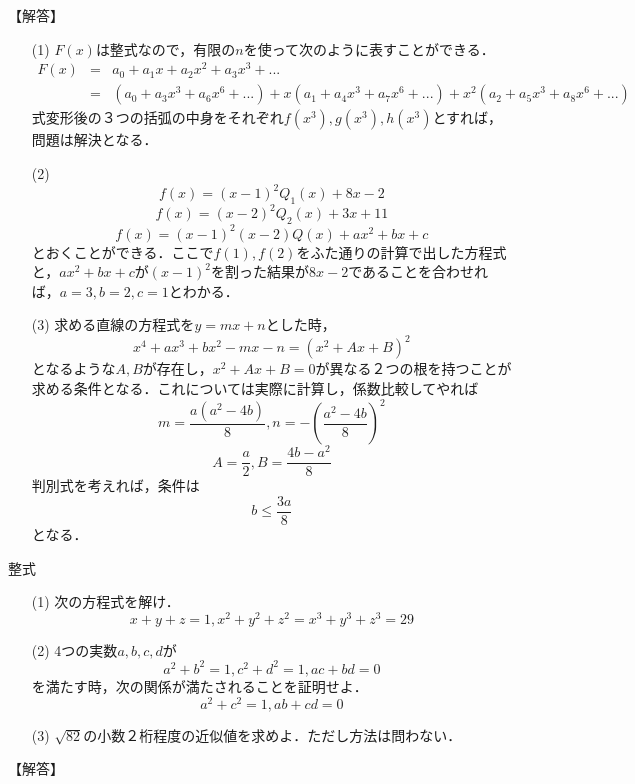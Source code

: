 \documentclass[a4paper,fleqn,dvipdfmx]{jsarticle}
\begin{document}
\begin{flushleft}
【解答】
\end{flushleft}

\begin{itemize}
    \item [(1)] $F(x)$は整式なので，有限の$n$を使って次のように表すことができる．
    \begin{eqnarray}
        F(x)&=&a_0+a_1x+a_2x^2+a_3x^3+...\\ &=&(a_0+a_3x^3+a_6x^6+...)+x(a_1+a_4x^3+a_7x^6+...)+x^2(a_2+a_5x^3+a_8x^6+...)
    \end{eqnarray}
    式変形後の３つの括弧の中身をそれぞれ$f(x^3),g(x^3),h(x^3)$とすれば，問題は解決となる．
    \item [(2)] $$f(x)=(x-1)^2Q_1(x)+8x-2$$
    $$f(x)=(x-2)^2Q_2(x)+3x+11$$
    $$f(x)=(x-1)^2(x-2)Q(x)+ax^2+bx+c$$
    とおくことができる．ここで$f(1),f(2)$をふた通りの計算で出した方程式と，$ax^2+bx+c$が$(x-1)^2$を割った結果が$8x-2$であることを合わせれば，$a=3,b=2,c=1$とわかる．
    \item [(3)] 求める直線の方程式を$y=mx+n$とした時，$$x^4+ax^3+bx^2-mx-n=(x^2+Ax+B)^2$$となるような$A,B$が存在し，$x^2+Ax+B=0$が異なる２つの根を持つことが求める条件となる．これについては実際に計算し，係数比較してやれば
    $$m=\frac{a(a^2-4b)}{8},n=-\left (\frac{a^2-4b}{8}\right )^2$$
    $$A=\frac{a}{2},B=\frac{4b-a^2}{8}$$
    判別式を考えれば，条件は
    $$b\leq \frac{3a}{8}$$
    となる．
\end{itemize}



\newpage
\begin{itembox}[l]{整式}
\begin{itemize}
    \item [(1)] 次の方程式を解け．
    $$x+y+z=1,x^2+y^2+z^2=x^3+y^3+z^3=29$$
    \item [(2)] 4つの実数$a,b,c,d$が
    $$a^2+b^2=1,c^2+d^2=1,ac+bd=0$$
    を満たす時，次の関係が満たされることを証明せよ．
    $$a^2+c^2=1,ab+cd=0$$
    \item [(3)] $\sqrt{82}$の小数２桁程度の近似値を求めよ．ただし方法は問わない．
\end{itemize}
\end{itembox}

\begin{flushleft}
【解答】
\end{flushleft}
\end{document}
